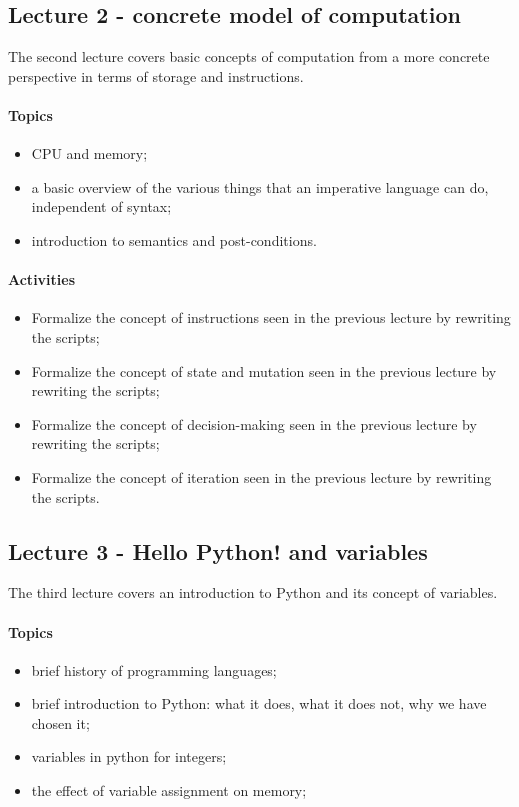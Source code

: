 			\subsection{Lecture 2 - concrete model of computation}
				The second lecture covers basic concepts of computation from a more concrete perspective in terms of storage and instructions.

				\paragraph*{Topics}
					\begin{itemize}
						\item CPU and memory;
						\item a basic overview of the various things that an imperative language can do, independent of syntax;
						\item introduction to semantics and post-conditions.
					\end{itemize}

				\paragraph*{Activities}
					\begin{itemize}
						\item Formalize the concept of instructions seen in the previous lecture by rewriting the scripts;
						\item Formalize the concept of state and mutation seen in the previous lecture by rewriting the scripts;
						\item Formalize the concept of decision-making seen in the previous lecture by rewriting the scripts;
						\item Formalize the concept of iteration seen in the previous lecture by rewriting the scripts.
					\end{itemize}


			\subsection{Lecture 3 - Hello Python! and variables}
				The third lecture covers an introduction to Python and its concept of variables.

				\paragraph*{Topics}
					\begin{itemize}
						\item brief history of programming languages;
						\item brief introduction to Python: what it does, what it does not, why we have chosen it;
						\item variables in python for integers;
						\item the effect of variable assignment on memory;
					\end{itemize}

